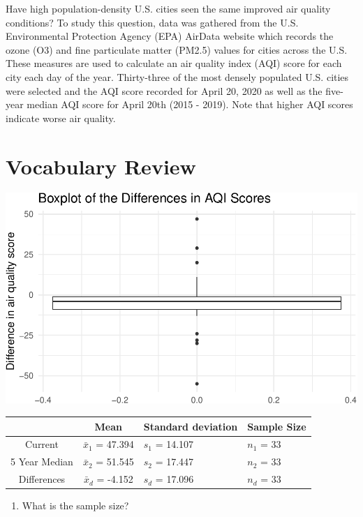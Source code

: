 \documentclass[
]{report}
\providecommand{\tightlist}{%
  \setlength{\itemsep}{0pt}\setlength{\parskip}{0pt}}
\begin{document}
Have high population-density U.S. cities seen the same improved air quality conditions? To study this question, data was gathered from the U.S. Environmental Protection Agency (EPA) AirData website which records the ozone (O3) and fine particulate matter (PM2.5) values for cities across the U.S. These measures are used to calculate an air quality index (AQI) score for each city each day of the year. Thirty-three of the most densely populated U.S. cities were selected and the AQI score recorded for April 20, 2020 as well as the five-year median AQI score for April 20th (2015 - 2019). Note that higher AQI scores indicate worse air quality.

\hypertarget{vocabulary-review}{%
\section{Vocabulary Review}\label{vocabulary-review}}

\begin{center}\includegraphics[width=0.7\linewidth]{08-paired_files/figure-latex/unnamed-chunk-2-1} \end{center}

\begin{longtable}[]{@{}ccll@{}}
\toprule
& Mean & Standard deviation & Sample Size\tabularnewline
\midrule
\endhead
Current & \(\bar{x}_1\) = 47.394 & \(s_1\) = 14.107 & \(n_1\) = 33\tabularnewline
5 Year Median & \(\bar{x}_2\) = 51.545 & \(s_2\) = 17.447 & \(n_2\) = 33\tabularnewline
Differences & \(\bar{x}_d\) = -4.152 & \(s_d\) = 17.096 & \(n_d\) = 33\tabularnewline
\bottomrule
\end{longtable}

\begin{enumerate}
\def\labelenumi{\arabic{enumi}.}
\tightlist
\item
  What is the sample size?
\end{enumerate}

\vspace{0.5in}
\end{document}

